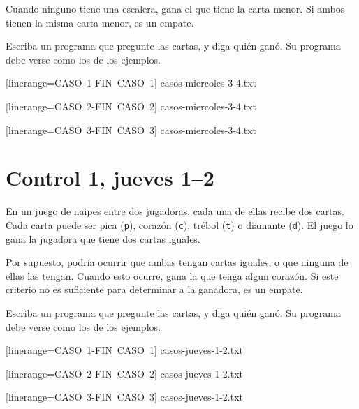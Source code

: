 \documentclass[12pt,spanish,a5paper,landscape]{article}
\begin{document}
  Cuando ninguno tiene una escalera,
  gana el que tiene la carta menor.
  Si ambos tienen la misma carta menor, es un empate.

  Escriba un programa que pregunte las cartas,
  y diga quién ganó.
  Su programa debe verse como los de los ejemplos.

  \begin{minipage}{0.25\textwidth}
      [linerange=CASO\ 1-FIN\ CASO\ 1]%
      {casos-miercoles-3-4.txt}
  \end{minipage}
  \hspace{1em}
  \begin{minipage}{0.25\textwidth}
      [linerange=CASO\ 2-FIN\ CASO\ 2]%
      {casos-miercoles-3-4.txt}
  \end{minipage}
  \hspace{1em}
  \begin{minipage}{0.25\textwidth}
      [linerange=CASO\ 3-FIN\ CASO\ 3]%
      {casos-miercoles-3-4.txt}
  \end{minipage}

  \newpage
  \part*{Control 1, jueves 1--2}
  \newpage

  En un juego de naipes entre dos jugadoras,
  cada una de ellas recibe dos cartas.
  Cada carta puede ser
  pica (\verb+p+),
  corazón (\verb+c+),
  trébol (\verb+t+) o
  diamante (\verb+d+).
  El juego lo gana la jugadora que tiene dos cartas iguales.

  Por supuesto,
  podría ocurrir que ambas tengan cartas iguales,
  o que ninguna de ellas las tengan.
  Cuando esto ocurre, gana la que tenga algun corazón.
  Si este criterio no es suficiente para determinar a la ganadora,
  es un empate.

  Escriba un programa que pregunte las cartas,
  y diga quién ganó.
  Su programa debe verse como los de los ejemplos.

  \begin{minipage}{0.25\textwidth}
      [linerange=CASO\ 1-FIN\ CASO\ 1]%
      {casos-jueves-1-2.txt}
  \end{minipage}
  \hspace{1em}
  \begin{minipage}{0.25\textwidth}
      [linerange=CASO\ 2-FIN\ CASO\ 2]%
      {casos-jueves-1-2.txt}
  \end{minipage}
  \hspace{1em}
  \begin{minipage}{0.25\textwidth}
      [linerange=CASO\ 3-FIN\ CASO\ 3]%
      {casos-jueves-1-2.txt}
  \end{minipage}
\end{document}
